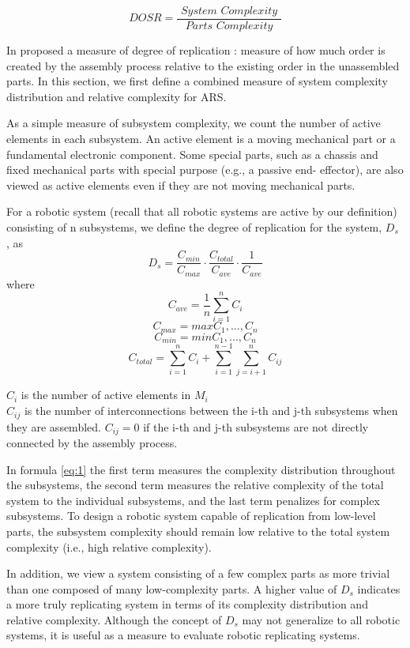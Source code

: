 \[\textit{DOSR} = \frac{\textit{ System\ Complexity }}{\textit{ Parts\ Complexity }}\]

In \citeyear{Lee2007Robotic} \citeauthor{Lee2007Robotic} proposed a measure of degree of replication \cite{Lee2007Robotic}:
measure of how much order is created by the assembly process relative to the existing order in
the unassembled parts. 
In this section, we first define a combined measure 
of system complexity distribution and relative complexity for ARS.

As a simple measure of subsystem complexity, we count the number of active elements in
each subsystem. An active element is a moving mechanical part or a fundamental electronic component.
Some special parts, such as a chassis and fixed mechanical parts with special purpose (e.g., a passive end-
effector), are also viewed as active elements even if they are not moving mechanical parts.


For a robotic system (recall that all robotic systems are active by our definition) 
consisting of n subsystems, we define the degree of replication for the system, $D_s$ , as
\begin{equation}
    \label{eq:3}
    D_s = \frac{C_{min}}{C_{max}} \cdot \frac{C_{total}}{C_{ave}} \cdot \frac{1}{C_{ave}} 
\end{equation}
where
\[ C_{ave} = \frac{1}{n} \sum_{i=1}^{n}{C_i} \] 
\[ C_{max} = max{C_1,...,C_n} \]
\[ C_{min} = min{C_1,...,C_n} \]
\[ C_{total} = \sum_{i=1}^{n}{C_i} + \sum_{i=1}^{n-1} \sum_{j=i+1}^{n}{C_{ij}} \]

$C_i$ is the number of active elements in $M_i$ \\ 
$C_{ij}$ is the number of interconnections between the i-th and j-th subsystems when they are assembled. 
$C_{ij}= 0$ if the i-th and j-th subsystems are not directly connected by the assembly process. 

In formula \ref{eq:1} the first term measures the complexity distribution
throughout the subsystems, the second term measures the relative 
complexity of the total system to the individual subsystems, 
and the last term penalizes for complex subsystems. 
To design a robotic system capable of replication from low-level
parts, the subsystem complexity should remain low relative to the
total system complexity (i.e., high relative complexity). 

In addition, we view a system consisting of a few complex parts as more trivial
than one composed of many low-complexity parts. A higher value
of $D_s$ indicates a more truly replicating system in terms of its 
complexity distribution and relative complexity. Although the concept
of $D_s$ may not generalize to all robotic systems, it is useful as a
measure to evaluate robotic replicating systems.



